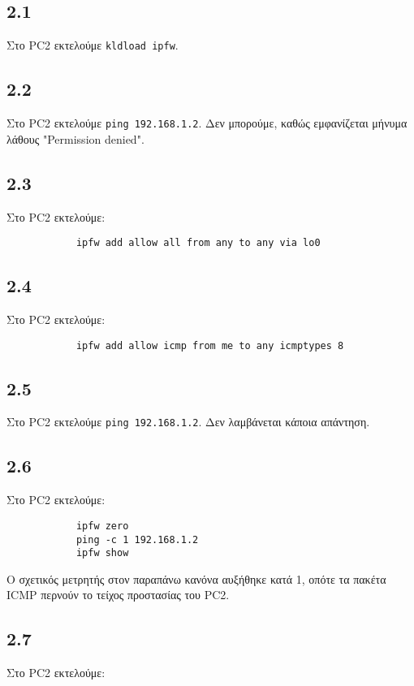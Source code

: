 \documentclass[a4paper, 12pt]{article}
\begin{document}
	\subsection*{2.1}
		Στο PC2 εκτελούμε \verb|kldload ipfw|.

	\subsection*{2.2}
		Στο PC2 εκτελούμε \verb|ping 192.168.1.2|. Δεν μπορούμε, καθώς εμφανίζεται μήνυμα λάθους "Permission denied".

	\subsection*{2.3}
		Στο PC2 εκτελούμε:
		
		\begin{verbatim}
			ipfw add allow all from any to any via lo0
		\end{verbatim}

	\subsection*{2.4}
		Στο PC2 εκτελούμε:
		
		\begin{verbatim}
			ipfw add allow icmp from me to any icmptypes 8
		\end{verbatim}

	\subsection*{2.5}
		Στο PC2 εκτελούμε \verb|ping 192.168.1.2|. Δεν λαμβάνεται κάποια απάντηση.

	\subsection*{2.6}
		Στο PC2 εκτελούμε:
		
		\begin{verbatim}
			ipfw zero 
			ping -c 1 192.168.1.2
			ipfw show
		\end{verbatim}
		
		Ο σχετικός μετρητής στον παραπάνω κανόνα αυξήθηκε κατά 1, οπότε τα πακέτα ICMP περνούν το τείχος προστασίας του PC2.

	\subsection*{2.7}
		Στο PC2 εκτελούμε:
		
\end{document}

